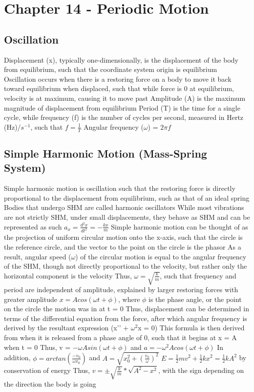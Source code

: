 \documentclass[11 pt, twoside]{article}
\newenvironment{outline*}
{
	\begin{outline}[enumerate]
	}
	{\end{outline}
}
\begin{document}
\section{Chapter 14 - Periodic Motion}
\subsection{Oscillation}
\begin{outline*}
\1 Displacement (x), typically one-dimensionally, is the displacement of the body from equilibrium, such that the coordinate system origin is equilibrium
\2 Oscillation occurs when there is a restoring force on a body to move it back toward equilibrium when displaced, such that while force is 0 at equilibrium, velocity is at maximum, causing it to move past
\1 Amplitude (A) is the maximum magnitude of displacement from equilibrium
\1 Period (T) is the time for a single cycle, while frequency (f) is the number of cycles per second, measured in Hertz (Hz)/$s^{-1}$, such that $f = \frac{1}{T}$
\1 Angular frequency ($\omega$) = $2\pi f$
\end{outline*}
\subsection{Simple Harmonic Motion (Mass-Spring System)}
\begin{outline*}
\1 Simple harmonic motion is oscillation such that the restoring force is directly proportional to the displacement from equilibrium, such as that of an ideal spring
\2 Bodies that undergo SHM are called harmonic oscillators
\2 While most vibrations are not strictly SHM, under small displacements, they behave as SHM and can be represented as such
\2 $a_x = \frac{d^2x}{dt^2} = -\frac{kx}{m}$
\1 Simple harmonic motion can be thought of as the projection of uniform circular motion onto the x-axis, such that the circle is the reference circle, and the vector to the point on the circle is the phasor
\2 As a result, angular speed ($\omega$) of the circular motion is equal to the angular frequency of the SHM, though not directly proportional to the velocity, but rather only the horizontal component is the velocity
\2 Thus, $\omega = \sqrt{\frac{k}{m}}$, such that frequency and period are independent of amplitude, explained by larger restoring forces with greater amplitude
\1 $x = Acos(\omega t + \phi)$, where $\phi$ is the phase angle, or the point on the circle the motion was in at t = 0
\2 Thus, displacement can be determined in terms of the differential equation from the force, after which angular frequency is derived by the resultant expression (x’’ + $\omega^2$x = 0)
\2 This formula is then derived from when it is released from a phase angle of 0, such that it begins at x = A when t = 0
\2 Thus, v = $-\omega Asin(\omega t + \phi)$ and $a = -\omega^2Acos(\omega t + \phi)$
\2 In addition, $\phi = arctan(\frac{-v_0}{\omega x_0})$ and $A = \sqrt{x_0^2 + (\frac{v_0}{\omega})^2}$
\1 $E = \frac{1}{2}mv^2 + \frac{1}{2}kx^2 = \frac{1}{2}kA^2$ by conservation of energy
\2 Thus, $v = \pm\sqrt{\frac{k}{m}}*\sqrt{A^2 - x^2}$, with the sign depending on the direction the body is going
\end{outline*}
\end{document}
